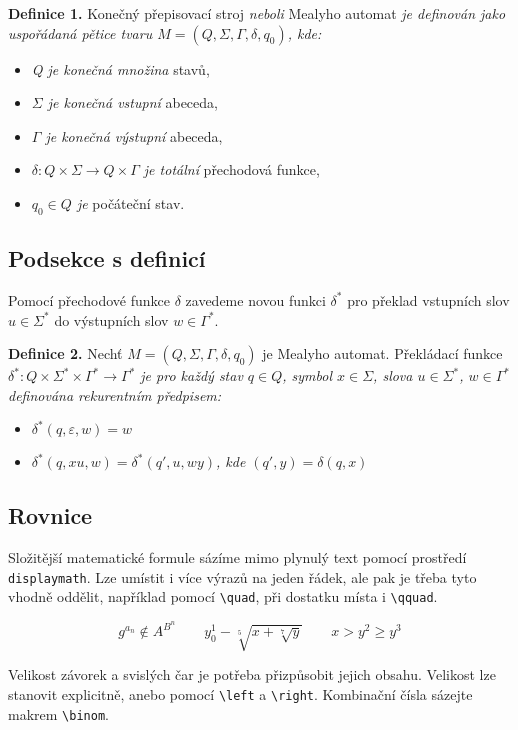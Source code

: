 \documentclass[a4paper, twocolumn, 11pt]{article}
\begin{document}
\noindent\textbf{Definice 1.} Konečný přepisovací stroj \emph{neboli} Mealyho automat \emph{je definován jako uspořádaná pětice tvaru $M=(Q,\Sigma,\Gamma,\delta,q_0)$, kde:}

\begin{itemize}
    \item \emph{Q je konečná množina} stavů,
    \item \emph{$\Sigma$ je konečná vstupní} abeceda,
    \item \emph{$\Gamma$ je konečná výstupní} abeceda,
    \item \emph{$\delta:Q\times\Sigma\rightarrow Q\times\Gamma$ je totální} přechodová funkce,
    \item \emph{$q_0\in Q$ je} počáteční stav.
\end{itemize}

\subsection{Podsekce s definicí}

Pomocí přechodové funkce $\delta$ zavedeme novou funkci $\delta^*$ pro překlad vstupních slov $u\in\Sigma^*$ do výstupních slov $w\in\Gamma^*$.

\noindent\textbf{Definice 2.} Nechť $M=(Q,\Sigma,\Gamma,\delta,q_0)$ je Mealyho automat. Překládací funkce \emph{$\delta^*:Q\times\Sigma^*\times\Gamma^*\rightarrow\Gamma^*$ je pro každý stav $q\in Q$, symbol $x\in\Sigma$, slova $u\in\Sigma^*$, $w\in\Gamma^*$ definována rekurentním předpisem:}

\begin{itemize}
    \item $\delta^*(q,\varepsilon,w)=w$
    \item \emph{$\delta^*(q,xu,w)=\delta^*(q',u,wy)$, kde $(q',y)=\delta(q,x)$}
\end{itemize}

\subsection{Rovnice}

Složitější matematické formule sázíme mimo plynulý text pomocí prostředí \texttt{displaymath}. Lze umístit i více výrazů na jeden řádek, ale pak je třeba tyto vhodně oddělit, například pomocí \verb|\quad|, při dostatku místa i \verb|\qquad|.

$$g^{a_n}\notin A^{B^n}\qquad y^1_0-\sqrt[5]{x+\sqrt[7]{y}}\qquad x>y^2\geq y^3$$

Velikost závorek a svislých čar je potřeba přizpůsobit jejich obsahu. Velikost lze stanovit explicitně, anebo pomocí \verb|\left| a \verb|\right|. Kombinační čísla sázejte makrem \verb|\binom|.
\end{document}
